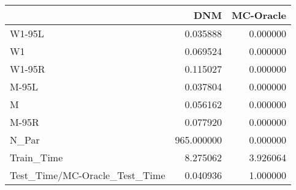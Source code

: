\begin{tabular}{lrr}
\toprule
{} &         DNM &  MC-Oracle \\
\midrule
W1-95L                        &    0.035888 &   0.000000 \\
W1                            &    0.069524 &   0.000000 \\
W1-95R                        &    0.115027 &   0.000000 \\
M-95L                         &    0.037804 &   0.000000 \\
M                             &    0.056162 &   0.000000 \\
M-95R                         &    0.077920 &   0.000000 \\
N\_Par                         &  965.000000 &   0.000000 \\
Train\_Time                    &    8.275062 &   3.926064 \\
Test\_Time/MC-Oracle\_Test\_Time &    0.040936 &   1.000000 \\
\bottomrule
\end{tabular}
